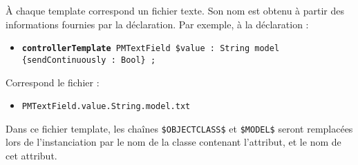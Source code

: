 



À chaque template correspond un fichier texte. Son nom est obtenu à partir des informations fournies par la déclaration. Par exemple, à la déclaration :
\begin{itemize}
  \item[] \texttt{\small {\bf controllerTemplate} PMTextField \$value : String model \{sendContinuously : Bool\} ;}
\end{itemize}


Correspond le fichier :

\begin{itemize}
  \item[] \texttt{\small PMTextField.value.String.model.txt}
\end{itemize}


Dans ce fichier template, les chaînes \texttt{\$OBJECTCLASS\$} et \texttt{\$MODEL\$} seront remplacées lors de l'instanciation par le nom de la classe contenant l'attribut, et le nom de cet attribut.
